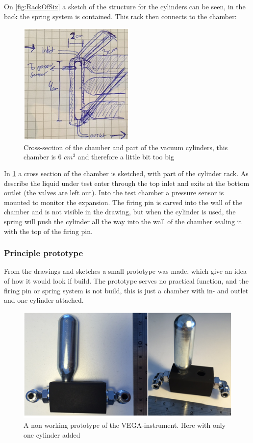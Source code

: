 On \ref{fig:RackOfSix} a sketch of the structure for the cylinders can be seen, in the back the spring system is contained. This rack then connects to the chamber:

\begin{figure}[htb]
  \centering
  \includegraphics[scale=1]{figures/GasDetectionAgge/ChamberAndRack.png}
  \caption{Cross-section of the chamber and part of the vacuum cylinders, this chamber is 6 $cm^3$ and therefore a little bit too big}
  \label{fig:CrossSectionProto}
\end{figure}

In \ref{fig:CrossSectionProto} a cross section of the chamber is sketched, with part of the cylinder rack. As describe the liquid under test enter through the top inlet and exits at the bottom outlet (the valves are left out). Into the test chamber a pressure sensor is mounted to monitor the expansion. The firing pin is carved into the wall of the chamber and is not visible in the drawing, but when the cylinder is used, the spring will push the cylinder all the way into the wall of the chamber sealing it with the top of the firing pin.

\subsubsection{Principle prototype}

From the drawings and sketches a small prototype was made, which give an idea of how it would look if build. The prototype serves no practical function, and the firing pin or spring system is not build, this is just a chamber with in- and outlet and one cylinder attached.

\begin{figure}[htb]
  \centering
  \includegraphics[scale=1]{figures/GasDetectionAgge/Prototype}
  \caption{A non working prototype of the VEGA-instrument. Here with only one cylinder added}
  \label{fig:NonProto}
\end{figure}

